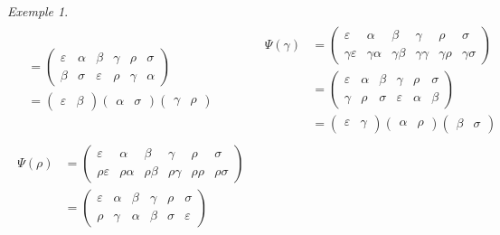 \documentclass{report}
\theoremstyle{definition}
\theoremstyle{remark}
\newtheorem*{exem}{Exemple}
\begin{document}
\begin{exem}
\begin{align*}
\begin{split}
				&= \begin{pmatrix}
					\varepsilon&\alpha&\beta&\gamma&\rho&\sigma\\
					\beta&\sigma&\varepsilon&\rho&\gamma&\alpha
				\end{pmatrix}\\
				&= \begin{pmatrix}
					\varepsilon&\beta
				\end{pmatrix} \begin{pmatrix}
					\alpha&\sigma
				\end{pmatrix} \begin{pmatrix}
					\gamma&\rho
				\end{pmatrix}
			\end{split}
			&
			\begin{split}
				\Psi(\gamma)&= \begin{pmatrix}
					\varepsilon&\alpha&\beta&\gamma&\rho&\sigma\\
					\gamma\varepsilon&\gamma\alpha&\gamma\beta&\gamma\gamma&\gamma\rho&\gamma\sigma
				\end{pmatrix}\\
				&= \begin{pmatrix}
					\varepsilon&\alpha&\beta&\gamma&\rho&\sigma\\
					\gamma&\rho&\sigma&\varepsilon&\alpha&\beta
				\end{pmatrix}\\
				&= \begin{pmatrix}
					\varepsilon&\gamma
				\end{pmatrix} \begin{pmatrix}
					\alpha&\rho
				\end{pmatrix} \begin{pmatrix}
					\beta&\sigma
				\end{pmatrix}
			\end{split}
			\\[1em]
			\begin{split}
				\Psi(\rho)&= \begin{pmatrix}
					\varepsilon&\alpha&\beta&\gamma&\rho&\sigma\\
					\rho\varepsilon&\rho\alpha&\rho\beta&\rho\gamma&\rho\rho&\rho\sigma
				\end{pmatrix}\\
				&= \begin{pmatrix}
					\varepsilon&\alpha&\beta&\gamma&\rho&\sigma\\
					\rho&\gamma&\alpha&\beta&\sigma&\varepsilon
				\end{pmatrix}\\

\end{split}
\end{align*}
\end{exem}
\end{document}
